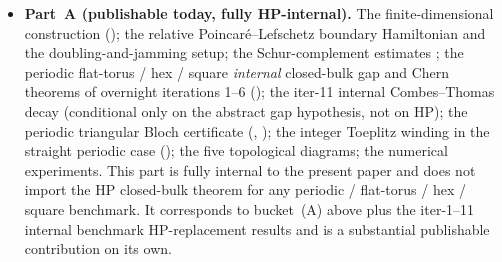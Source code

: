 \documentclass[11pt]{article}
\numberwithin{equation}{section}
\theoremstyle{definition}
\theoremstyle{remark}
\begin{document}
\begin{itemize}[leftmargin=2em]
\item \textbf{Part~A (publishable today, fully HP-internal).} The finite-dimensional
construction (); the relative Poincar\'e--Lefschetz boundary
Hamiltonian and the doubling-and-jamming setup; the Schur-complement estimates
;
the periodic flat-torus / hex / square \emph{internal} closed-bulk gap and Chern theorems
of overnight iterations 1--6
();
the iter-11 internal Combes--Thomas decay
 (conditional only on the abstract gap hypothesis, not on
HP); the periodic triangular Bloch certificate
(, );
the integer Toeplitz winding in the straight periodic case
(); the five topological
diagrams; the numerical experiments. This part is fully internal to the present paper and
does not import the HP closed-bulk theorem for any periodic / flat-torus / hex / square
benchmark. It corresponds to bucket~(A) above plus the iter-1--11 internal benchmark
HP-replacement results and is a substantial publishable contribution on its own.


\end{itemize}
\end{document}
